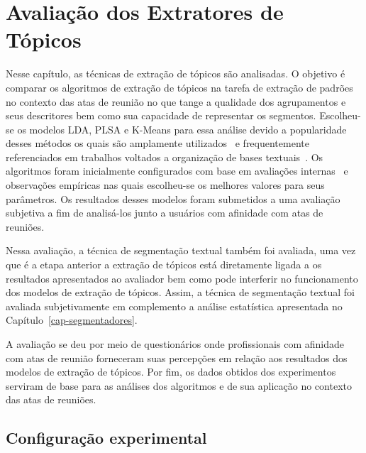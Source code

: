 \chapter{Avaliação dos Extratores de Tópicos}\label{cap-extratores}


Nesse capítulo, as técnicas de extração de tópicos são analisadas. O objetivo é comparar os algoritmos de extração de tópicos na tarefa de extração de padrões no contexto das atas de reunião no que tange a qualidade dos agrupamentos e seus descritores bem como sua capacidade de representar os segmentos. Escolheu-se os modelos LDA, PLSA e K-Means para essa análise devido a popularidade desses métodos os quais são amplamente utilizados~\cite{DZhu20122} e frequentemente referenciados em trabalhos voltados a organização de bases textuais~\cite{Aggarwal2018, OCallaghan2015, Steyvers2007}.
Os algoritmos foram inicialmente configurados com base em avaliações internas~\cite{Hassani2017} e observações empíricas nas quais escolheu-se os melhores valores para seus parâmetros. Os resultados desses modelos foram submetidos a uma avaliação subjetiva a fim de analisá-los junto a usuários com afinidade com atas de reuniões. 

Nessa avaliação, a técnica de segmentação textual também foi avaliada, uma vez que é a etapa anterior a extração de tópicos está diretamente ligada a os resultados apresentados ao avaliador bem como pode interferir no funcionamento dos modelos de extração de tópicos. Assim, a técnica de segmentação textual foi avaliada subjetivamente em complemento a análise estatística apresentada no Capítulo~\ref{cap-segmentadores}.

A avaliação se deu por meio de questionários onde profissionais com afinidade com atas de reunião forneceram suas percepções em relação aos resultados dos modelos de extração de tópicos. Por fim, os dados obtidos dos experimentos serviram de base para as análises dos algoritmos e de sua aplicação no contexto das atas de reuniões.

\section{Configuração experimental}

